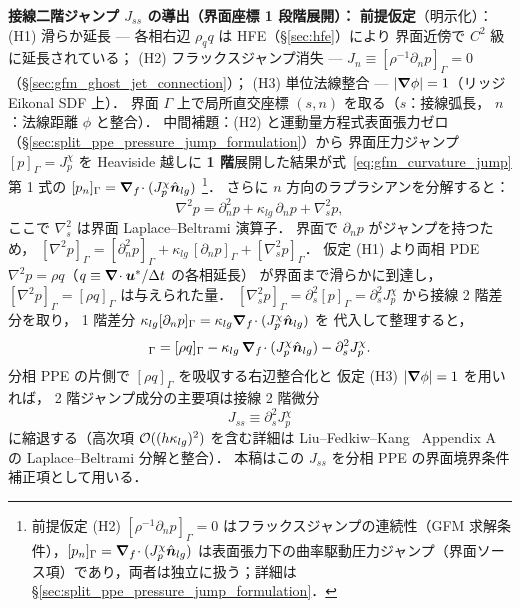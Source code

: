 \noindent\textbf{接線二階ジャンプ $J_{ss}$ の導出（界面座標 1 段階展開）：}
\textbf{前提仮定}（明示化）：
(H1) 滑らか延長 — 各相右辺 $\rho_q q$ は HFE（\S\ref{sec:hfe}）により
界面近傍で $C^2$ 級に延長されている；
(H2) フラックスジャンプ消失 — $J_n\equiv[\rho^{-1}\partial_n p]_\Gamma=0$
（\S\ref{sec:gfm_ghost_jet_connection}）；
(H3) 単位法線整合 — $|\bm{\nabla}\phi|=1$（リッジ Eikonal SDF 上）．
界面 $\Gamma$ 上で局所直交座標 $(s,n)$ を取る（$s$：接線弧長，
$n$：法線距離 $\phi$ と整合）．
中間補題：(H2) と運動量方程式表面張力ゼロ（\S\ref{sec:split_ppe_pressure_jump_formulation}）から
界面圧力ジャンプ $[p]_\Gamma=J_p^\chi$ を Heaviside 越しに
\textbf{1 階}展開した結果が式~\eqref{eq:gfm_curvature_jump} 第 1 式の
$[p_n]_\Gamma=\bm{\nabla}_f\!\cdot(J_p^\chi\hat{\bm n}_{lg})$%
\footnote{前提仮定 (H2) $[\rho^{-1}\partial_n p]_\Gamma=0$ はフラックスジャンプの連続性（GFM 求解条件），$[p_n]_\Gamma=\bm{\nabla}_f\!\cdot(J_p^\chi\hat{\bm n}_{lg})$ は表面張力下の曲率駆動圧力ジャンプ（界面ソース項）であり，両者は独立に扱う；詳細は \S\ref{sec:split_ppe_pressure_jump_formulation}．}．
さらに $n$ 方向のラプラシアンを分解すると：
\begin{equation}
  \nabla^2 p = \partial_n^2 p + \kappa_{lg}\,\partial_n p + \nabla_s^2 p,
  \label{eq:laplace_beltrami_normal_decomp}
\end{equation}
ここで $\nabla_s^2$ は界面 Laplace--Beltrami 演算子．
界面で $\partial_n p$ がジャンプを持つため，
$[\nabla^2 p]_\Gamma = [\partial_n^2 p]_\Gamma + \kappa_{lg}\,[\partial_n p]_\Gamma + [\nabla_s^2 p]_\Gamma$．
仮定 (H1) より両相 PDE $\nabla^2 p = \rho q$（$q\equiv\bm{\nabla}\!\cdot\bm{u}^*/\Delta t$ の各相延長）
が界面まで滑らかに到達し，
$[\nabla^2 p]_\Gamma = [\rho q]_\Gamma$ は与えられた量．
$[\nabla_s^2 p]_\Gamma=\partial_s^2[p]_\Gamma=\partial_s^2 J_p^\chi$
から接線 2 階差分を取り，
1 階差分 $\kappa_{lg}[\partial_n p]_\Gamma=\kappa_{lg}\bm{\nabla}_f\!\cdot(J_p^\chi\hat{\bm n}_{lg})$ を
代入して整理すると，
\begin{equation}
  [\partial_n^2 p]_\Gamma
  = [\rho q]_\Gamma
    - \kappa_{lg}\,\bnabla_f\!\cdot(J_p^\chi\hat{\bm n}_{lg})
    - \partial_s^2 J_p^\chi.
  \label{eq:kappa_s_derivation}
\end{equation}
分相 PPE の片側で $[\rho q]_\Gamma$ を吸収する右辺整合化と
仮定 (H3) $|\bm{\nabla}\phi|=1$ を用いれば，
2 階ジャンプ成分の主要項は接線 2 階微分
\begin{equation}
  J_{ss} \equiv \partial_s^2 J_p^\chi
  \label{eq:kappa_s_def}
\end{equation}
に縮退する（高次項 $\mathcal{O}((h\kappa_{lg})^2)$ を含む詳細は
Liu--Fedkiw--Kang~\cite{Fedkiw1999} Appendix A の Laplace--Beltrami 分解と整合）．
本稿はこの $J_{ss}$ を分相 PPE の界面境界条件補正項として用いる．

